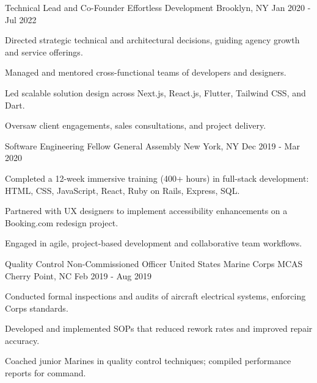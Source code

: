 \begin{cventries}
  \cventry
    {Technical Lead and Co-Founder} %
    {Effortless Development} %
    {Brooklyn, NY} %
    {Jan 2020 - Jul 2022} %
    {
      \begin{cvitems} %
        \item {Directed strategic technical and architectural decisions, guiding agency growth and service offerings.}
        \item {Managed and mentored cross-functional teams of developers and designers.}
        \item {Led scalable solution design across Next.js, React.js, Flutter, Tailwind CSS, and Dart.}
        \item {Oversaw client engagements, sales consultations, and project delivery.}
      \end{cvitems}
    }

  \cventry
    {Software Engineering Fellow} %
    {General Assembly} %
    {New York, NY} %
    {Dec 2019 - Mar 2020} %
    {
      \begin{cvitems} %
        \item {Completed a 12-week immersive training (400+ hours) in full-stack development: HTML, CSS, JavaScript, React, Ruby on Rails, Express, SQL.}
        \item {Partnered with UX designers to implement accessibility enhancements on a Booking.com redesign project.}
        \item {Engaged in agile, project-based development and collaborative team workflows.}
      \end{cvitems}
    }

  \cventry
    {Quality Control Non-Commissioned Officer} %
    {United States Marine Corps} %
    {MCAS Cherry Point, NC} %
    {Feb 2019 - Aug 2019} %
    {
      \begin{cvitems} %
        \item {Conducted formal inspections and audits of aircraft electrical systems, enforcing Corps standards.}
        \item {Developed and implemented SOPs that reduced rework rates and improved repair accuracy.}
        \item {Coached junior Marines in quality control techniques; compiled performance reports for command.}
      \end{cvitems}
    }


\end{cventries}
